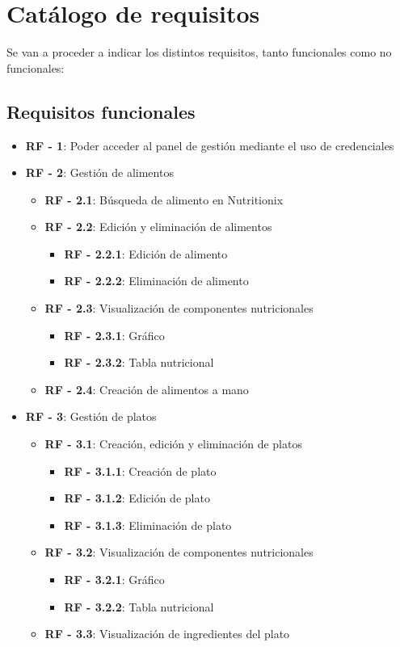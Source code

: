 \section{Catálogo de requisitos}

Se van a proceder a indicar los distintos requisitos, tanto funcionales como no funcionales:

\subsection{Requisitos funcionales}

\begin{itemize}
	\item \textbf{RF - 1}: Poder acceder al panel de gestión mediante el uso de credenciales
	\item \textbf{RF - 2}: Gestión de alimentos
	\begin{itemize}
		\item \textbf{RF - 2.1}: Búsqueda de alimento en Nutritionix
		\item \textbf{RF - 2.2}: Edición y eliminación de alimentos
		\begin{itemize}
			\item \textbf{RF - 2.2.1}: Edición de alimento
			\item \textbf{RF - 2.2.2}: Eliminación de alimento
		\end{itemize}
		\item \textbf{RF - 2.3}: Visualización de componentes nutricionales
		\begin{itemize}
			\item \textbf{RF - 2.3.1}: Gráfico
			\item \textbf{RF - 2.3.2}: Tabla nutricional
		\end{itemize}
		\item \textbf{RF - 2.4}: Creación de alimentos a mano 
	\end{itemize}
	
	\item \textbf{RF - 3}: Gestión de platos
	\begin{itemize}
		\item \textbf{RF - 3.1}: Creación, edición y eliminación de platos
		\begin{itemize}
			\item \textbf{RF - 3.1.1}: Creación de plato
			\item \textbf{RF - 3.1.2}: Edición de plato
			\item \textbf{RF - 3.1.3}: Eliminación de plato
		\end{itemize}
		\item \textbf{RF - 3.2}: Visualización de componentes nutricionales
		\begin{itemize}
			\item \textbf{RF - 3.2.1}: Gráfico
			\item \textbf{RF - 3.2.2}: Tabla nutricional
		\end{itemize}
		\item \textbf{RF - 3.3}: Visualización de ingredientes del plato 
	\end{itemize}
	

\end{itemize}
